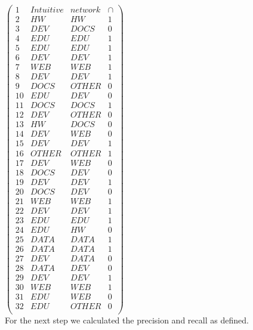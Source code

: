\documentclass[paper=A4,pagesize=auto,12pt,headinclude=true,footinclude=true,BCOR=0mm,DIV=calc]{scrartcl}
\begin{document}
	$\begin{pmatrix}
		1 & Intuitive & network & \cap\\
		2 &  HW & HW  & 1 \\
		3 & DEV & DOCS & 0 \\
		4 & EDU & EDU & 1 \\
		5 & EDU & EDU & 1 \\
		6 & DEV & DEV & 1 \\
		7 & WEB & WEB & 1 \\
		8 & DEV & DEV & 1 \\
		9 & DOCS & OTHER & 0 \\
		10 & EDU & DEV & 0 \\
		11 & DOCS & DOCS & 1 \\
		12 & DEV & OTHER & 0 \\
		13 & HW & DOCS & 0 \\
		14 & DEV & WEB & 0 \\
		15 & DEV & DEV & 1 \\
		16 & OTHER & OTHER & 1 \\
		17 & DEV & WEB & 0 \\
		18 & DOCS & DEV & 0 \\
		19 & DEV & DEV & 1 \\
		20 & DOCS & DEV & 0 \\
		21 & WEB & WEB & 1 \\
		22 & DEV & DEV & 1 \\
		23 & EDU & EDU & 1 \\
		24 & EDU & HW & 0\\
		25 & DATA & DATA & 1 \\
		26 & DATA & DATA & 1 \\
		27 & DEV & DATA & 0 \\
		28 & DATA & DEV & 0 \\
		29 & DEV & DEV & 1 \\
		30 & WEB & WEB & 1 \\
		31 & EDU &  WEB& 0\\
		32 & EDU & OTHER & 0 \\
	\end{pmatrix}$
	\\
	\newpage	
	For the next step we calculated the precision and recall as defined.
	\\
	
\end{document}
